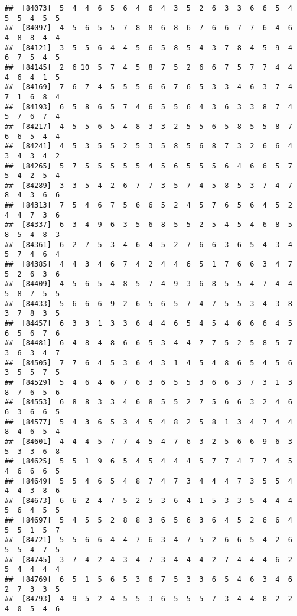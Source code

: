 \documentclass[
]{book}
\begin{document}
\begin{verbatim}
##  [84073]  5  4  4  6  5  6  4  6  4  3  5  2  6  3  3  6  6  5  4  5  5  4  5  5
##  [84097]  4  5  6  5  5  7  8  8  6  8  6  7  6  6  7  7  6  4  6  4  8  8  4  4
##  [84121]  3  5  5  6  4  4  5  6  5  8  5  4  3  7  8  4  5  9  4  6  7  5  4  5
##  [84145]  2  6 10  5  7  4  5  8  7  5  2  6  6  7  5  7  7  4  4  4  6  4  1  5
##  [84169]  7  6  7  4  5  5  5  6  6  7  6  5  3  3  4  6  3  7  4  7  1  6  8  4
##  [84193]  6  5  8  6  5  7  4  6  5  5  6  4  3  6  3  3  8  7  4  5  7  6  7  4
##  [84217]  4  5  5  6  5  4  8  3  3  2  5  5  6  5  8  5  5  8  7  6  6  5  4  4
##  [84241]  4  5  3  5  5  2  5  3  5  8  5  6  8  7  3  2  6  6  4  3  4  3  4  2
##  [84265]  5  7  5  5  5  5  5  4  5  6  5  5  5  6  4  6  6  5  7  5  4  2  5  4
##  [84289]  3  3  5  4  2  6  7  7  3  5  7  4  5  8  5  3  7  4  7  8  4  3  6  6
##  [84313]  7  5  4  6  7  5  6  6  5  2  4  5  7  6  5  6  4  5  2  4  4  7  3  6
##  [84337]  6  3  4  9  6  3  5  6  8  5  5  2  5  4  5  4  6  8  5  8  5  4  8  3
##  [84361]  6  2  7  5  3  4  6  4  5  2  7  6  6  3  6  5  4  3  4  5  7  4  6  4
##  [84385]  4  4  3  4  6  7  4  2  4  4  6  5  1  7  6  6  3  4  7  5  2  6  3  6
##  [84409]  4  5  6  5  4  8  5  7  4  9  3  6  8  5  5  4  7  4  4  5  8  7  5  5
##  [84433]  5  6  6  6  9  2  6  5  6  5  7  4  7  5  5  3  4  3  8  3  7  8  3  5
##  [84457]  6  3  3  1  3  3  6  4  4  6  5  4  5  4  6  6  6  4  5  6  5  6  7  6
##  [84481]  6  4  8  4  8  6  6  5  3  4  4  7  7  5  2  5  8  5  7  3  6  3  4  7
##  [84505]  7  7  6  4  5  3  6  4  3  1  4  5  4  8  6  5  4  5  6  3  5  5  7  5
##  [84529]  5  4  6  4  6  7  6  3  6  5  5  3  6  6  3  7  3  1  3  8  7  6  5  6
##  [84553]  6  8  8  3  3  4  6  8  5  5  2  7  5  6  6  3  2  4  6  6  3  6  6  5
##  [84577]  5  4  3  6  5  3  4  5  4  8  2  5  8  1  3  4  7  4  4  8  4  6  5  4
##  [84601]  4  4  4  5  7  7  4  5  4  7  6  3  2  5  6  6  9  6  3  5  3  3  6  8
##  [84625]  5  5  1  9  6  5  4  5  4  4  4  5  7  7  4  7  7  4  5  4  6  6  6  5
##  [84649]  5  5  4  6  5  4  8  7  4  7  3  4  4  4  7  3  5  5  4  4  4  3  8  6
##  [84673]  6  6  2  4  7  5  2  5  3  6  4  1  5  3  3  5  4  4  4  5  6  4  5  5
##  [84697]  5  4  5  5  2  8  8  3  6  5  6  3  6  4  5  2  6  6  4  5  5  1  5  7
##  [84721]  5  5  6  6  4  4  7  6  3  4  7  5  2  6  6  5  4  2  6  5  5  4  7  5
##  [84745]  3  7  4  2  4  3  4  7  3  4  4  4  2  7  4  4  4  6  2  5  4  4  4  4
##  [84769]  6  5  1  5  6  5  3  6  7  5  3  3  6  5  4  6  3  4  6  2  7  3  3  5
##  [84793]  4  9  5  2  4  5  5  3  6  5  5  5  7  3  4  4  8  2  2  4  0  5  4  6

\end{verbatim}
\end{document}
